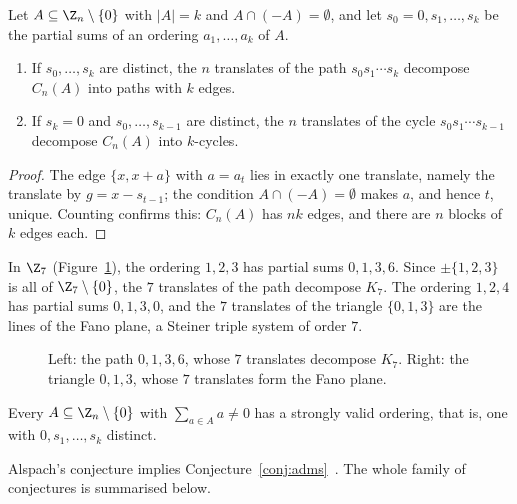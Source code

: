 \begin{proposition}\label{prop:difference}
Let $A\subseteq\Z_n\setminus\{0\}$ with $|A|=k$ and $A\cap(-A)=\emptyset$, and let $s_0=0,s_1,\dots,s_k$ be the partial sums of an ordering $a_1,\dots,a_k$ of $A$.
\begin{enumerate}
\item If $s_0,\dots,s_k$ are distinct, the $n$ translates of the path $s_0s_1\cdots s_k$ decompose $C_n(A)$ into paths with $k$ edges.
\item If $s_k=0$ and $s_0,\dots,s_{k-1}$ are distinct, the $n$ translates of the cycle $s_0s_1\cdots s_{k-1}$ decompose $C_n(A)$ into $k$-cycles.
\end{enumerate}
\end{proposition}

\begin{proof}
The edge $\{x,x+a\}$ with $a=a_t$ lies in exactly one translate, namely the translate by $g=x-s_{t-1}$; the condition $A\cap(-A)=\emptyset$ makes $a$, and hence $t$, unique. Counting confirms this: $C_n(A)$ has $nk$ edges, and there are $n$ blocks of $k$ edges each.
\end{proof}

\begin{example}\label{ex:z7-blocks}
In $\Z_7$ (Figure~\ref{fig:z7-blocks}), the ordering $1,2,3$ has partial sums $0,1,3,6$. Since $\pm\{1,2,3\}$ is all of $\Z_7\setminus\{0\}$, the $7$ translates of the path decompose $K_7$. The ordering $1,2,4$ has partial sums $0,1,3,0$, and the $7$ translates of the triangle $\{0,1,3\}$ are the lines of the Fano plane, a Steiner triple system of order $7$.
\end{example}

\begin{figure}[ht]
\centering

\caption{Left: the path $0,1,3,6$, whose $7$ translates decompose $K_7$. Right: the triangle $0,1,3$, whose $7$ translates form the Fano plane.}
\label{fig:z7-blocks}
\end{figure}

\begin{conjecture}\label{conj:alspach}
Every $A\subseteq\Z_n\setminus\{0\}$ with $\sum_{a\in A}a\neq0$ has a strongly valid ordering, that is, one with $0,s_1,\dots,s_k$ distinct.
\end{conjecture}

Alspach's conjecture implies Conjecture~\ref{conj:adms}~\cite[Proposition~1.1]{admc16}. The whole family of conjectures is summarised below.

